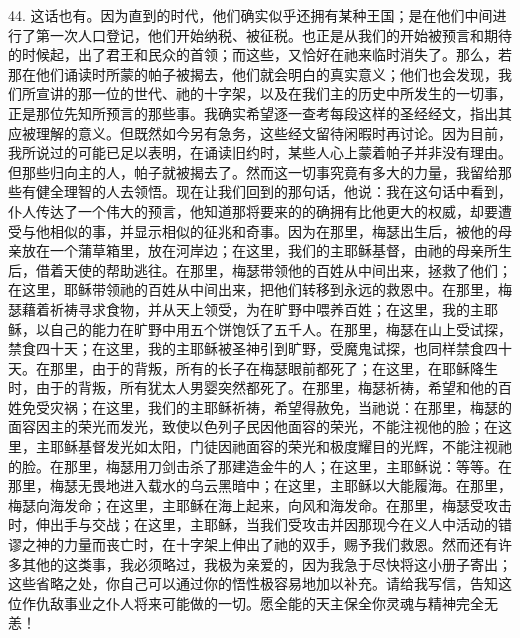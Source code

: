 44. 这话也有。因为直到的时代，他们确实似乎还拥有某种王国；是在他们中间进行了第一次人口登记，他们开始纳税、被征税。也正是从我们的开始被预言和期待的时候起，出了君王和民众的首领；而这些，又恰好在祂来临时消失了。那么，若那在他们诵读时所蒙的帕子被揭去，他们就会明白的真实意义；他们也会发现，我们所宣讲的那一位的世代、祂的十字架，以及在我们主的历史中所发生的一切事，正是那位先知所预言的那些事。我确实希望逐一查考每段这样的圣经经文，指出其应被理解的意义。但既然如今另有急务，这些经文留待闲暇时再讨论。因为目前，我所说过的可能已足以表明，在诵读旧约时，某些人心上蒙着帕子并非没有理由。但那些归向主的人，帕子就被揭去了。然而这一切事究竟有多大的力量，我留给那些有健全理智的人去领悟。现在让我们回到的那句话，他说：我在这句话中看到，仆人传达了一个伟大的预言，他知道那将要来的的确拥有比他更大的权威，却要遭受与他相似的事，并显示相似的征兆和奇事。因为在那里，梅瑟出生后，被他的母亲放在一个蒲草箱里，放在河岸边；在这里，我们的主耶稣基督，由祂的母亲所生后，借着天使的帮助逃往。在那里，梅瑟带领他的百姓从中间出来，拯救了他们；在这里，耶稣带领祂的百姓从中间出来，把他们转移到永远的救恩中。在那里，梅瑟藉着祈祷寻求食物，并从天上领受，为在旷野中喂养百姓；在这里，我的主耶稣，以自己的能力在旷野中用五个饼饱饫了五千人。在那里，梅瑟在山上受试探，禁食四十天；在这里，我的主耶稣被圣神引到旷野，受魔鬼试探，也同样禁食四十天。在那里，由于的背叛，所有的长子在梅瑟眼前都死了；在这里，在耶稣降生时，由于的背叛，所有犹太人男婴突然都死了。在那里，梅瑟祈祷，希望和他的百姓免受灾祸；在这里，我们的主耶稣祈祷，希望得赦免，当祂说：在那里，梅瑟的面容因主的荣光而发光，致使以色列子民因他面容的荣光，不能注视他的脸；在这里，主耶稣基督发光如太阳，门徒因祂面容的荣光和极度耀目的光辉，不能注视祂的脸。在那里，梅瑟用刀剑击杀了那建造金牛的人；在这里，主耶稣说：等等。在那里，梅瑟无畏地进入载水的乌云黑暗中；在这里，主耶稣以大能履海。在那里，梅瑟向海发命；在这里，主耶稣在海上起来，向风和海发命。在那里，梅瑟受攻击时，伸出手与交战；在这里，主耶稣，当我们受攻击并因那现今在义人中活动的错谬之神的力量而丧亡时，在十字架上伸出了祂的双手，赐予我们救恩。然而还有许多其他的这类事，我必须略过，我极为亲爱的，因为我急于尽快将这小册子寄出；这些省略之处，你自己可以通过你的悟性极容易地加以补充。请给我写信，告知这位作仇敌事业之仆人将来可能做的一切。愿全能的天主保全你灵魂与精神完全无恙！\par

